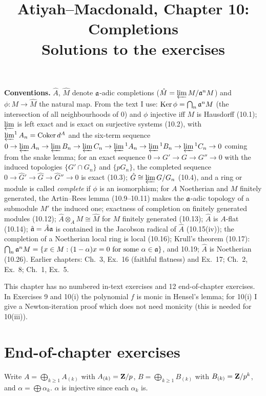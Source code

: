 \documentclass[11pt]{article}
\title{Atiyah--Macdonald, Chapter 10: Completions\\[2pt]\large Solutions to the exercises}
\author{}
\date{}
\begin{document}
\maketitle
\noindent\textbf{Conventions.} $\hat A$, $\hat M$ denote $\mathfrak a$-adic completions ($\hat M=\varprojlim M/\mathfrak a^nM$) and $\phi:M\to\hat M$ the natural map. From the text I use: $\operatorname{Ker}\phi=\bigcap_n\mathfrak a^nM$ (the intersection of all neighbourhoods of $0$) and $\phi$ injective iff $M$ is Hausdorff (10.1); $\varprojlim$ is left exact and is exact on surjective systems (10.2), with $\varprojlim^1A_n=\operatorname{Coker}d^A$ and the six-term sequence $0\to\varprojlim A_n\to\varprojlim B_n\to\varprojlim C_n\to\varprojlim{}^1A_n\to\varprojlim{}^1B_n\to\varprojlim{}^1C_n\to0$ coming from the snake lemma; for an exact sequence $0\to G'\to G\to G''\to0$ with the induced topologies $\{G'\cap G_n\}$ and $\{pG_n\}$, the completed sequence $0\to\hat G'\to\hat G\to\hat G''\to0$ is exact (10.3); $\hat G\cong\varprojlim G/G_n$ (10.4), and a ring or module is called \emph{complete} if $\phi$ is an isomorphism; for $A$ Noetherian and $M$ finitely generated, the Artin--Rees lemma (10.9--10.11) makes the $\mathfrak a$-adic topology of a submodule $M'$ the induced one; exactness of completion on finitely generated modules (10.12); $\hat A\otimes_AM\cong\hat M$ for $M$ finitely generated (10.13); $\hat A$ is $A$-flat (10.14); $\hat{\mathfrak a}=\hat A\mathfrak a$ is contained in the Jacobson radical of $\hat A$ (10.15(iv)); the completion of a Noetherian local ring is local (10.16); Krull's theorem (10.17): $\bigcap_n\mathfrak a^nM=\{x\in M:(1-\alpha)x=0\text{ for some }\alpha\in\mathfrak a\}$, and 10.19; $\hat A$ is Noetherian (10.26). Earlier chapters: Ch.~3, Ex.~16 (faithful flatness) and Ex.~17; Ch.~2, Ex.~8; Ch.~1, Ex.~5.

This chapter has no numbered in-text exercises and 12 end-of-chapter exercises. In Exercises 9 and 10(i) the polynomial $f$ is monic in Hensel's lemma; for 10(i) I give a Newton-iteration proof which does not need monicity (this is needed for 10(iii)).

\section*{End-of-chapter exercises}

\pf
Write $A=\bigoplus_{k\ge1}A_{(k)}$ with $A_{(k)}=\mathbf Z/p$, $B=\bigoplus_{k\ge1}B_{(k)}$ with $B_{(k)}=\mathbf Z/p^k$, and $\alpha=\bigoplus\alpha_k$. $\alpha$ is injective since each $\alpha_k$ is.
\end{document}
